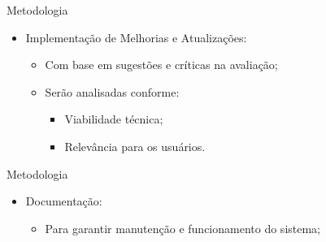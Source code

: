 \begin{frame}{Metodologia}
    \begin{itemize}
        \item Implementação de Melhorias e Atualizações: \vspace{0.5cm}
              \begin{itemize}
                  \item Com base em sugestões e críticas na avaliação; \vspace{0.5cm}
                  \item Serão analisadas conforme: \vspace{0.5cm}
                        \begin{itemize}
                            \item Viabilidade técnica; \vspace{0.25cm}
                            \item Relevância para os usuários. \vspace{0.25cm}
                        \end{itemize}
              \end{itemize}
    \end{itemize}
\end{frame}

\begin{frame}{Metodologia}
    \begin{itemize}
        \item Documentação: \vspace{0.5cm}
              \begin{itemize}
                  \item Para garantir manutenção e funcionamento do sistema; \vspace{0.5cm}
              \end{itemize}
    \end{itemize}
\end{frame}